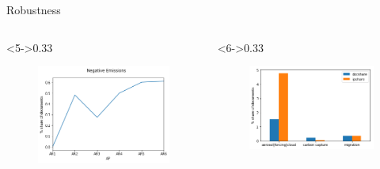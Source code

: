 \documentclass[9pt]{beamer}
\begin{document}
\begin{frame}{Robustness}
\begin{columns}
\end{columns}
\begin{columns}

	\begin{column}<5->{0.33\linewidth}
		\begin{figure}
			\includegraphics[width=\linewidth]{../plots/negative_emissions_share}
		\end{figure}
	\end{column}

	\begin{column}<6->{0.33\linewidth}
	\begin{figure}
		\includegraphics[width=\linewidth]{../plots/ipcc_rep_simple}
	\end{figure}
	\end{column}
\end{columns}

\end{frame}
\end{document}
